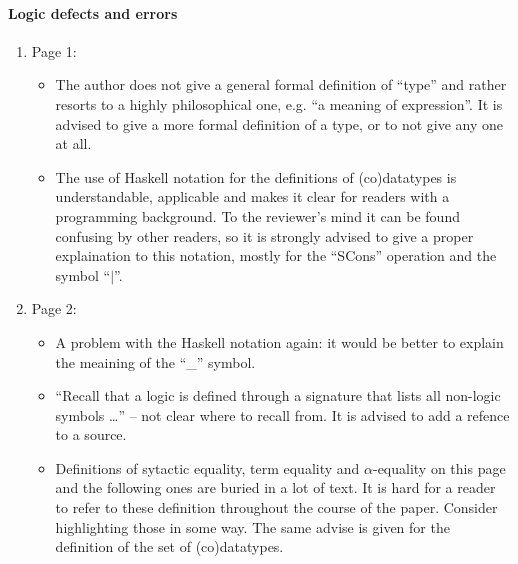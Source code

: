 \paragraph{Logic defects and errors}
\begin{enumerate}
	\item Page 1:
	\begin{itemize}
		\item The author does not give a general formal definition of ``type'' and rather resorts to a highly philosophical one, e.g. ``a meaning of expression''. It is advised to give a more formal definition of a type, or to not give any one at all.
		\item The use of Haskell notation for the definitions of (co)datatypes is understandable, applicable and makes it clear for readers with a programming background. To the reviewer's mind it can be found confusing by other readers, so it is strongly advised to give a proper explaination to this notation, mostly for the ``SCons'' operation and the symbol ``$|$''.
	\end{itemize} 

	\item Page 2:
	\begin{itemize}
		\item A problem with the Haskell notation again: it would be better to explain the meaining of the ``\_'' symbol.
		\item ``Recall that a logic is deﬁned through a signature that lists all non-logic symbols \dots'' -- not clear where to recall from. It is advised to add a refence to a source.
		\item Definitions of sytactic equality, term equality and $\alpha$-equality on this page and the following ones are buried in a lot of text. It is hard for a reader to refer to these definition throughout the course of the paper. Consider highlighting those in some way. The same advise is given for the definition of the set of (co)datatypes.
	\end{itemize}


\end{enumerate}
